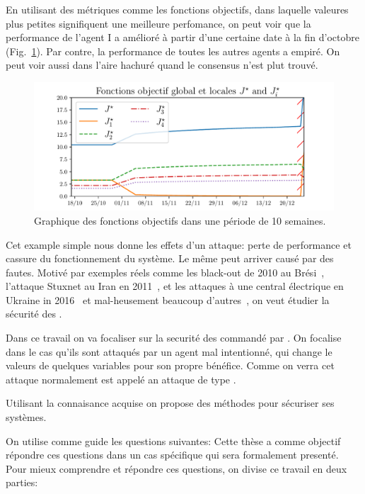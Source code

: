 \documentclass[../main.tex]{subfiles}
\begin{document}
En utilisant des métriques comme les fonctions objectifs, dans laquelle valeures plus petites signifiquent une meilleure perfomance, on peut voir que la performance de l'agent I a amélioré à partir d'une certaine date à la fin d'octobre (Fig.~\ref{fig:change_in_j_fr}).
Par contre, la performance de toutes les autres agents a empiré.
On peut voir aussi dans l'aire hachuré quand le consensus n'est plut trouvé.
\begin{figure}[h]
  \centering
  \includegraphics[width=.8\textwidth]{../img/example_introduction/example_J_fr.pdf}
  \caption{Graphique des fonctions objectifs dans une période de 10 semaines.}\label{fig:change_in_j_fr}
\end{figure}

Cet example simple nous donne les effets d'un attaque: perte de performance et cassure du fonctionnement du système.
Le même peut arriver causé par des fautes.
Motivé par exemples réels comme les black-out de 2010 au Brési~\cite{Conti2010}, l'attaque Stuxnet au Iran en 2011~\cite{Langner2011}, et les attaques à une central électrique en Ukraine in 2016~\cite{Bindra2017} et mal-heusement beaucoup d'autres~\cite{DingEtAl2018,DibajiEtAl2019}, on veut étudier la sécurité des \cps{}.

Dans ce travail on va focaliser sur la securité des \cps{} commandé par \dmpc{}.
On focalise dans le cas qu'ils sont attaqués par un agent mal intentionné, qui change le valeurs de quelques variables pour son propre bénéfice. Comme on verra cet attaque normalement est appelé an attaque de type \fdi{}.

Utilisant la connaisance acquise on propose des méthodes pour sécuriser ses systèmes.

On utilise comme guide les questions suivantes:
Cette thèse a comme objectif répondre ces questions dans un cas spécifique qui sera formalement presenté.
Pour mieux comprendre et répondre ces questions, on divise ce travail en deux parties:
\end{document}
